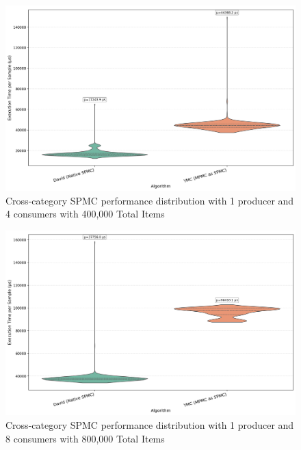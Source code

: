 \begin{figure}[H]
\centering
\caption{Cross-category SPMC performance distribution with 1 producer and 4 consumers with 400,000 Total Items}
\label{fig:cross-spmc-violin-4c}
\includegraphics[width=\textwidth]{images/results/best_in_spmc_performance_violin_1P4C.png}
\end{figure}

\begin{figure}[H]
\centering
\caption{Cross-category SPMC performance distribution with 1 producer and 8 consumers with 800,000 Total Items}
\label{fig:cross-spmc-violin-8c}
\includegraphics[width=\textwidth]{images/results/best_in_spmc_performance_violin_1P8C.png}
\end{figure}
